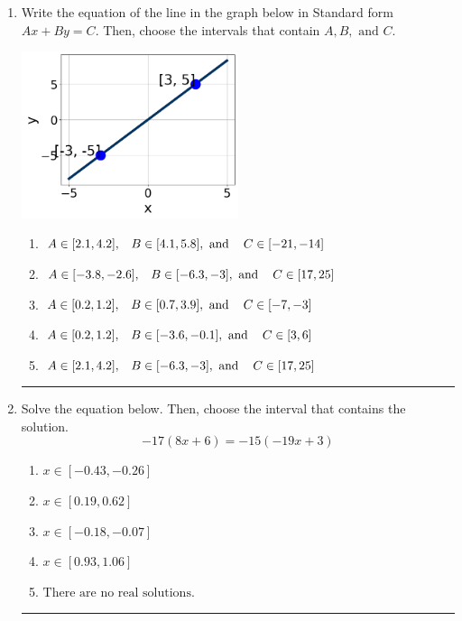 \documentclass[14pt]{extbook}
\newcommand{\litem}[1]{\item#1\hspace*{-1cm}\rule{\textwidth}{0.4pt}}
\begin{document}
\begin{enumerate}
{\begin{enumerate}[label=\Alph*.]
\end{enumerate} }
\litem{
Write the equation of the line in the graph below in Standard form $Ax+By=C$. Then, choose the intervals that contain $A, B, \text{ and } C$.
\begin{center}
    \includegraphics[width=0.5\textwidth]{../Figures/linearGraphToStandardCopyC.png}
\end{center}
\begin{enumerate}[label=\Alph*.]
\item \( A \in [2.1, 4.2], \hspace{3mm} B \in [4.1, 5.8], \text{ and } \hspace{3mm} C \in [-21, -14] \)
\item \( A \in [-3.8, -2.6], \hspace{3mm} B \in [-6.3, -3], \text{ and } \hspace{3mm} C \in [17, 25] \)
\item \( A \in [0.2, 1.2], \hspace{3mm} B \in [0.7, 3.9], \text{ and } \hspace{3mm} C \in [-7, -3] \)
\item \( A \in [0.2, 1.2], \hspace{3mm} B \in [-3.6, -0.1], \text{ and } \hspace{3mm} C \in [3, 6] \)
\item \( A \in [2.1, 4.2], \hspace{3mm} B \in [-6.3, -3], \text{ and } \hspace{3mm} C \in [17, 25] \)

\end{enumerate} }
\litem{
Solve the equation below. Then, choose the interval that contains the solution.\[ -17(8x + 6) = -15(-19x + 3) \]\begin{enumerate}[label=\Alph*.]
\item \( x \in [-0.43, -0.26] \)
\item \( x \in [0.19, 0.62] \)
\item \( x \in [-0.18, -0.07] \)
\item \( x \in [0.93, 1.06] \)
\item \( \text{There are no real solutions.} \)


\end{enumerate}}
\end{enumerate}
\end{document}
